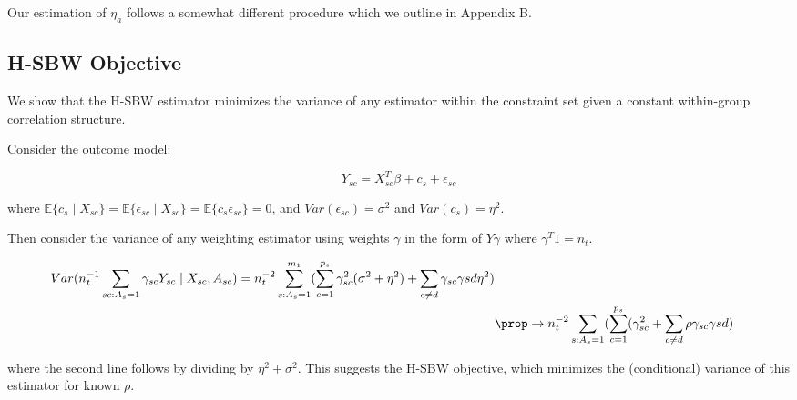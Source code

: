 Our estimation of $\eta_a$ follows a somewhat different procedure which we outline in Appendix B.

\subsection{H-SBW Objective}

We show that the H-SBW estimator minimizes the variance of any estimator within the constraint set given a constant within-group correlation structure.

Consider the outcome model:

\begin{equation}
    Y_{sc} = X_{sc}^T\beta + c_s + \epsilon_{sc}
\end{equation}

where $\mathbb{E}\{c_s \mid X_{sc}\} = \mathbb{E}\{\epsilon_{sc} \mid X_{sc}\} = \mathbb{E}\{c_s\epsilon_{sc}\} = 0$, and $Var(\epsilon_{sc}) = \sigma^2$ and $Var(c_s) = \eta^2$.

Then consider the variance of any weighting estimator using weights $\gamma$ in the form of $Y\gamma$ where $\gamma^T1 = n_t$.

\begin{align}
    Var(n_t^{-1}\sum_{sc: A_s = 1}\gamma_{sc}Y_{sc} \mid X_{sc}, A_{sc}) = n_t^{-2}\sum_{s: A_s = 1}^{m_1}(\sum_{c = 1}^{p_s}\gamma_{sc}^2(\sigma^2 + \eta^2) + \sum_{c \ne d}\gamma_{sc}\gamma{sd}\eta^2) \\
    &\prop\to n_t^{-2}\sum_{s: A_s = 1}(\sum_{c = 1}^{p_s}(\gamma_{sc}^2 + \sum_{c \ne d}\rho \gamma_{sc}\gamma{sd})
\end{align}

where the second line follows by dividing by $\eta^2 + \sigma^2$. This suggests the H-SBW objective, which minimizes the (conditional) variance of this estimator for known $\rho$.

